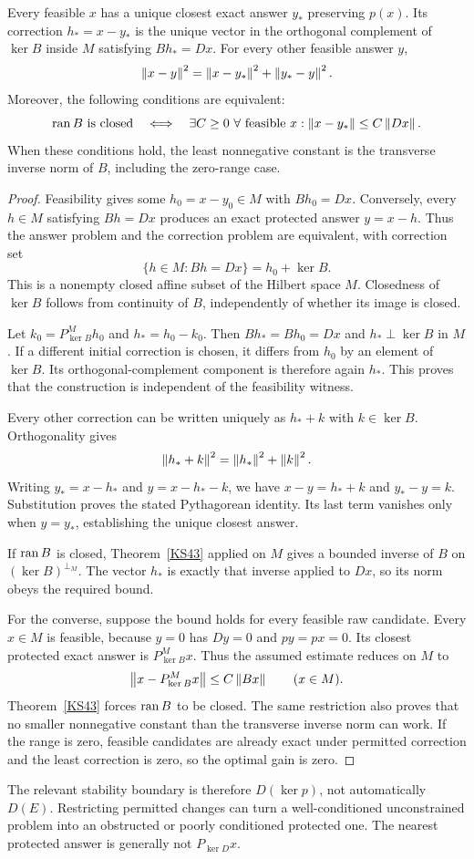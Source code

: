 \begin{theorem}\label{KS56}
Every feasible \(x\) has a unique closest exact answer \(y_*\) preserving \(p(x)\). Its correction \(h_*=x-y_*\) is the unique vector in the orthogonal complement of \(\ker B\) inside \(M\) satisfying \(Bh_*=Dx\). For every other feasible answer \(y\),
\[
 \left\lVert x-y\right\rVert^2=\left\lVert x-y_*\right\rVert^2+\left\lVert y_*-y\right\rVert^2.
\]
Moreover, the following conditions are equivalent:
\[
 \operatorname{ran} B\text{ is closed}
 \quad\Longleftrightarrow\quad
 \exists C\ge0\ \forall\text{ feasible }x:
 \left\lVert x-y_*\right\rVert\le C\left\lVert Dx\right\rVert.
\]
When these conditions hold, the least nonnegative constant is the transverse inverse norm of \(B\), including the zero-range case.
\end{theorem}
\begin{proof}
Feasibility gives some $h_0=x-y_0\in M$ with $Bh_0=Dx$. Conversely, every $h\in M$ satisfying $Bh=Dx$ produces an exact protected answer $y=x-h$. Thus the answer problem and the correction problem are equivalent, with correction set
\[
 \{h\in M:Bh=Dx\}=h_0+\ker B.
\]
This is a nonempty closed affine subset of the Hilbert space $M$. Closedness of $\ker B$ follows from continuity of $B$, independently of whether its image is closed.

Let $k_0=P^M_{\ker B}h_0$ and $h_*=h_0-k_0$. Then $Bh_*=Bh_0=Dx$ and $h_*\perp\ker B$ in $M$. If a different initial correction is chosen, it differs from $h_0$ by an element of $\ker B$. Its orthogonal-complement component is therefore again $h_*$. This proves that the construction is independent of the feasibility witness.

Every other correction can be written uniquely as $h_*+k$ with $k\in\ker B$. Orthogonality gives
\[
 \left\lVert h_*+k\right\rVert^2=\left\lVert h_*\right\rVert^2+\left\lVert k\right\rVert^2.
\]
Writing $y_*=x-h_*$ and $y=x-h_*-k$, we have $x-y=h_*+k$ and $y_*-y=k$. Substitution proves the stated Pythagorean identity. Its last term vanishes only when $y=y_*$, establishing the unique closest answer.

If $\operatorname{ran} B$ is closed, Theorem~\ref{KS43} applied on $M$ gives a bounded inverse of $B$ on $(\ker B)^{\perp_M}$. The vector $h_*$ is exactly that inverse applied to $Dx$, so its norm obeys the required bound.

For the converse, suppose the bound holds for every feasible raw candidate. Every $x\in M$ is feasible, because $y=0$ has $Dy=0$ and $py=px=0$. Its closest protected exact answer is $P^M_{\ker B}x$. Thus the assumed estimate reduces on $M$ to
\[
 \left\lVert x-P^M_{\ker B}x\right\rVert\le C\left\lVert Bx\right\rVert\qquad(x\in M).
\]
Theorem~\ref{KS43} forces $\operatorname{ran} B$ to be closed. The same restriction also proves that no smaller nonnegative constant than the transverse inverse norm can work. If the range is zero, feasible candidates are already exact under permitted correction and the least correction is zero, so the optimal gain is zero.
\end{proof}
The relevant stability boundary is therefore \(D(\ker p)\), not automatically \(D(E)\). Restricting permitted changes can turn a well-conditioned unconstrained problem into an obstructed or poorly conditioned protected one. The nearest protected answer is generally not \(P_{\ker D}x\).

